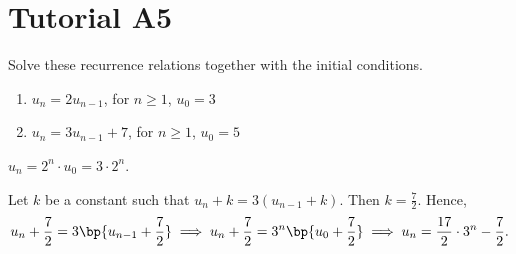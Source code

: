 \section{Tutorial A5}

\begin{problem}
    Solve these recurrence relations together with the initial conditions.

    \begin{enumerate}
        \item $u_n = 2u_{n-1}$, for $n \geq 1$, $u_0 = 3$
        \item $u_n = 3u_{n-1} + 7$, for $n \geq 1$, $u_0 = 5$
    \end{enumerate}
\end{problem}
\begin{solution}
    \begin{ppart}
        $u_n = 2^n \cdot u_0 = 3 \cdot 2^n$.
    \end{ppart}
    \begin{ppart}
        Let $k$ be a constant such that $u_n + k = 3(u_{n-1} + k)$. Then $k = \frac72$. Hence, \[u_n + \frac72 = 3\bp{u_{n-1} + \frac72} \implies u_n + \frac72 = 3^n \bp{u_0 + \frac72} \implies u_n = \frac{17}2 \cdot3^n  - \frac72.\]
    \end{ppart}
\end{solution}

